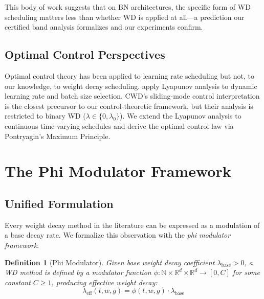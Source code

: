 \documentclass{article}
\newtheorem{definition}{Definition}
\begin{document}
This body of work suggests that on BN architectures, the specific form of WD scheduling matters less than whether WD is applied at all---a prediction our certified band analysis formalizes and our experiments confirm.

\subsection{Optimal Control Perspectives}

Optimal control theory has been applied to learning rate scheduling \citep{naganuma2026lr_control,ferbach2026adana} but not, to our knowledge, to weight decay scheduling. \citet{kondo2025lyapunov} apply Lyapunov analysis to dynamic learning rate and batch size selection. CWD's sliding-mode control interpretation \citep{chen2026cwd} is the closest precursor to our control-theoretic framework, but their analysis is restricted to binary WD ($\lambda \in \{0, \lambda_0\}$). We extend the Lyapunov analysis to continuous time-varying schedules and derive the optimal control law via Pontryagin's Maximum Principle.

\section{The Phi Modulator Framework}
\label{sec:phi}

\subsection{Unified Formulation}

Every weight decay method in the literature can be expressed as a modulation of a base decay rate. We formalize this observation with the \emph{phi modulator framework}.

\begin{definition}[Phi Modulator]
Given base weight decay coefficient $\lambda_{\text{base}} > 0$, a WD method is defined by a modulator function $\phi: \mathbb{N} \times \mathbb{R}^d \times \mathbb{R}^d \to [0, C]$ for some constant $C \geq 1$, producing effective weight decay:
\begin{equation}
\lambda_{\text{eff}}(t, w, g) = \phi(t, w, g) \cdot \lambda_{\text{base}}
\label{eq:phi_modulator}
\end{equation}
\end{definition}
\end{document}
